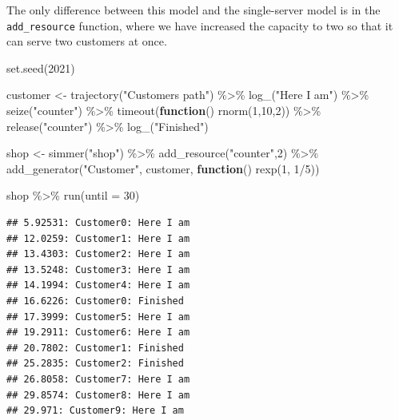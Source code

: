 \documentclass[
]{book}
\newenvironment{Shaded}{\begin{snugshade}}{\end{snugshade}}
\newcommand{\AttributeTok}[1]{\textcolor[rgb]{0.77,0.63,0.00}{#1}}
\newcommand{\ControlFlowTok}[1]{\textcolor[rgb]{0.13,0.29,0.53}{\textbf{#1}}}
\newcommand{\DecValTok}[1]{\textcolor[rgb]{0.00,0.00,0.81}{#1}}
\newcommand{\FunctionTok}[1]{\textcolor[rgb]{0.00,0.00,0.00}{#1}}
\newcommand{\NormalTok}[1]{#1}
\newcommand{\OtherTok}[1]{\textcolor[rgb]{0.56,0.35,0.01}{#1}}
\newcommand{\SpecialCharTok}[1]{\textcolor[rgb]{0.00,0.00,0.00}{#1}}
\newcommand{\StringTok}[1]{\textcolor[rgb]{0.31,0.60,0.02}{#1}}
\begin{document}
The only difference between this model and the single-server model is in the \texttt{add\_resource} function, where we have increased the capacity to two so that it can serve two customers at once.

\begin{Shaded}
\begin{Highlighting}[]
\FunctionTok{set.seed}\NormalTok{(}\DecValTok{2021}\NormalTok{)}

\NormalTok{customer }\OtherTok{\textless{}{-}}
  \FunctionTok{trajectory}\NormalTok{(}\StringTok{"Customer\textquotesingle{}s path"}\NormalTok{) }\SpecialCharTok{\%\textgreater{}\%}
  \FunctionTok{log\_}\NormalTok{(}\StringTok{"Here I am"}\NormalTok{) }\SpecialCharTok{\%\textgreater{}\%}
  \FunctionTok{seize}\NormalTok{(}\StringTok{"counter"}\NormalTok{) }\SpecialCharTok{\%\textgreater{}\%}
  \FunctionTok{timeout}\NormalTok{(}\ControlFlowTok{function}\NormalTok{() }\FunctionTok{rnorm}\NormalTok{(}\DecValTok{1}\NormalTok{,}\DecValTok{10}\NormalTok{,}\DecValTok{2}\NormalTok{)) }\SpecialCharTok{\%\textgreater{}\%}
  \FunctionTok{release}\NormalTok{(}\StringTok{"counter"}\NormalTok{) }\SpecialCharTok{\%\textgreater{}\%}
  \FunctionTok{log\_}\NormalTok{(}\StringTok{"Finished"}\NormalTok{)}

\NormalTok{shop }\OtherTok{\textless{}{-}}
  \FunctionTok{simmer}\NormalTok{(}\StringTok{"shop"}\NormalTok{) }\SpecialCharTok{\%\textgreater{}\%}
  \FunctionTok{add\_resource}\NormalTok{(}\StringTok{"counter"}\NormalTok{,}\DecValTok{2}\NormalTok{) }\SpecialCharTok{\%\textgreater{}\%}
  \FunctionTok{add\_generator}\NormalTok{(}\StringTok{"Customer"}\NormalTok{, customer, }\ControlFlowTok{function}\NormalTok{() }\FunctionTok{rexp}\NormalTok{(}\DecValTok{1}\NormalTok{, }\DecValTok{1}\SpecialCharTok{/}\DecValTok{5}\NormalTok{))}

\NormalTok{shop }\SpecialCharTok{\%\textgreater{}\%} \FunctionTok{run}\NormalTok{(}\AttributeTok{until =} \DecValTok{30}\NormalTok{)}
\end{Highlighting}
\end{Shaded}

\begin{verbatim}
## 5.92531: Customer0: Here I am
## 12.0259: Customer1: Here I am
## 13.4303: Customer2: Here I am
## 13.5248: Customer3: Here I am
## 14.1994: Customer4: Here I am
## 16.6226: Customer0: Finished
## 17.3999: Customer5: Here I am
## 19.2911: Customer6: Here I am
## 20.7802: Customer1: Finished
## 25.2835: Customer2: Finished
## 26.8058: Customer7: Here I am
## 29.8574: Customer8: Here I am
## 29.971: Customer9: Here I am
\end{verbatim}
\end{document}
